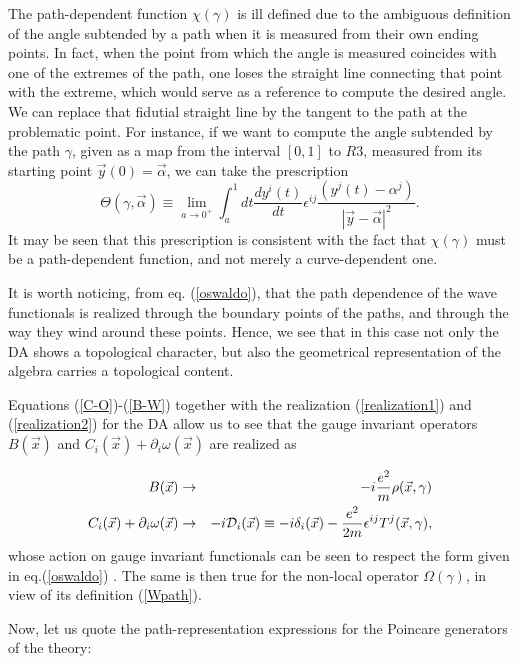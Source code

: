 \documentclass[a4paper,12pt]{article}
\newcommand{\eref}[1]{(\ref{#1})}
\begin{document}
  The path-dependent
function $\chi(\gamma)$ is ill defined due to the ambiguous
definition of the angle subtended by a path when it is measured
from their own ending points. In fact, when the point from which
the angle is measured coincides with one of the extremes of the
path, one loses the straight line connecting that point with the
extreme, which would serve as a reference to compute the desired
angle. We can replace that fidutial straight line by the tangent
to the path at the problematic point. For instance, if we want to
compute the angle subtended by the path $\gamma$, given as a map
from the interval $[0,1]$ to $R3$, measured from its starting
point $\vec y(0)=\vec\alpha$, we can take the prescription
\begin{equation}
\Theta(\gamma,\vec\alpha)\equiv\lim_{a\rightarrow0^+}\int_a^1dt\frac{dy^i(t)}{dt}
\epsilon^{ij}\frac{(y^j(t)-\alpha^j)}{|\vec y-\vec\alpha|^2}.
\end{equation}
It may be seen that this prescription is consistent with the fact
that $\chi(\gamma)$ must be a path-dependent function, and not
merely a curve-dependent one.

It is worth noticing, from eq. \eref{oswaldo}, that the path
dependence of the wave functionals is realized through the
boundary points of the paths, and through the way they wind
around these points. Hence, we see that in this case not only the
DA shows a topological character, but also the geometrical
representation of the algebra carries a topological content.

Equations \eref{C-O}-\eref{B-W} together with the realization
\eref{realization1} and \eref{realization2} for the DA allow us to
see that the gauge invariant operators $B(\vec x)$ and $C_i(\vec
x)+\partial_i\omega(\vec x)$ are realized as

\begin{eqnarray}
B(\vec x)&\rightarrow&-i\frac{e^2}m\rho(\vec x,\gamma)\\
C_i(\vec x)+\partial_i\omega(\vec x)&\rightarrow&-i{\cal
D}_i(\vec x) \equiv -i\delta_i(\vec
x)-\frac{e^2}{2m}\epsilon^{ij}T^j(\vec x,\gamma),
\end{eqnarray}
whose action on gauge invariant functionals can be seen to
respect the form  given in eq.\eref{oswaldo} \cite{LO}. The same
is then true for the non-local operator $\Omega({\gamma})$, in
view of its definition \eref{Wpath}.

Now, let us quote the path-representation expressions for
the Poincare generators of the theory:
\end{document}
